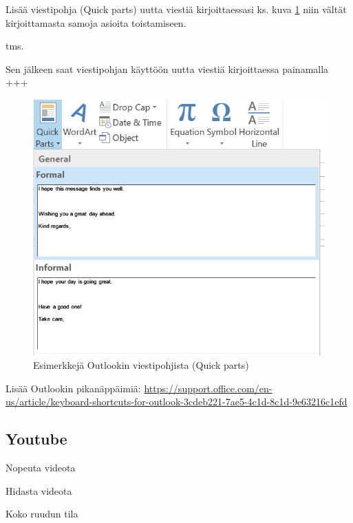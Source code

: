\documentclass[a5paper,9pt]{scrartcl}
\begin{document}
		Lisää viestipohja (Quick parts) uutta viestiä kirjoittaessasi ks. kuva \ref{fig:Quick_parts}  niin vältät kirjoittamasta samoja asioita toistamiseen.
		
		
		 tms.
		
		 Sen jälkeen saat viestipohjan käyttöön uutta viestiä kirjoittaessa painamalla \\ +++\keys{\return}
	 
	\begin{figure}[H]
		\includegraphics[width=\linewidth]{Quick_parts.png}
		\caption{Esimerkkejä Outlookin viestipohjista (Quick parts)}
		\label{fig:Quick_parts}
	\end{figure}

	\medskip
	
	Lisää Outlookin pikanäppäimiä: \url{https://support.office.com/en-us/article/keyboard-shortcuts-for-outlook-3cdeb221-7ae5-4c1d-8c1d-9e63216c1efd}
	
	\subsection{Youtube}
	
	\indent
	
	 Nopeuta videota
	
	\keys{\shift + ,} Hidasta videota
	
	 Koko ruudun tila
	
\end{document}
